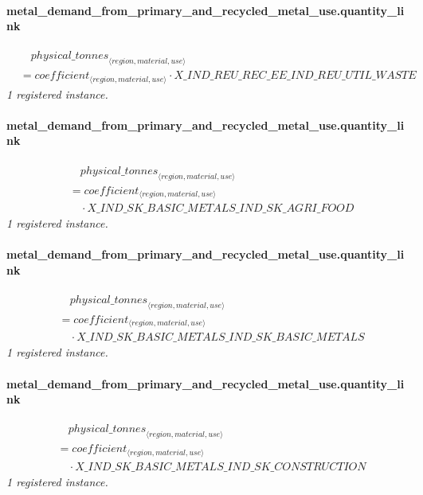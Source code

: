 \documentclass[11pt]{article}
\begin{document}
\paragraph{metal\_demand\_from\_primary\_and\_recycled\_metal\_use.quantity\_link}
\begin{align*}
&\quad {physical\_tonnes}_{\langle region, material, use\rangle}\\
&= coefficient_{\langle region, material, use\rangle} \cdot X\_IND\_REU\_REC\_EE\_IND\_REU\_UTIL\_WASTE
\end{align*}
\noindent\emph{1 registered instance.}\par
\paragraph{metal\_demand\_from\_primary\_and\_recycled\_metal\_use.quantity\_link}
\begin{align*}
&\quad {physical\_tonnes}_{\langle region, material, use\rangle}\\
&= coefficient_{\langle region, material, use\rangle}\\
&\quad {}\cdot X\_IND\_SK\_BASIC\_METALS\_IND\_SK\_AGRI\_FOOD
\end{align*}
\noindent\emph{1 registered instance.}\par
\paragraph{metal\_demand\_from\_primary\_and\_recycled\_metal\_use.quantity\_link}
\begin{align*}
&\quad {physical\_tonnes}_{\langle region, material, use\rangle}\\
&= coefficient_{\langle region, material, use\rangle}\\
&\quad {}\cdot X\_IND\_SK\_BASIC\_METALS\_IND\_SK\_BASIC\_METALS
\end{align*}
\noindent\emph{1 registered instance.}\par
\paragraph{metal\_demand\_from\_primary\_and\_recycled\_metal\_use.quantity\_link}
\begin{align*}
&\quad {physical\_tonnes}_{\langle region, material, use\rangle}\\
&= coefficient_{\langle region, material, use\rangle}\\
&\quad {}\cdot X\_IND\_SK\_BASIC\_METALS\_IND\_SK\_CONSTRUCTION
\end{align*}
\noindent\emph{1 registered instance.}\par
\end{document}
